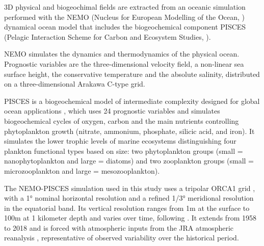 3D physical and biogeochimal fields are extracted from an oceanic simulation performed with the NEMO (Nucleus for European Modelling of the Ocean, \citealt{madecNEMOOceanEngine2019}) dynamical ocean model that includes the biogeochemical component PISCES (Pelagic Interaction Scheme for Carbon and Ecosystem Studies, \citealt{aumontPISCESv2OceanBiogeochemical2015}). 

NEMO simulates the dynamics and thermodynamics of the physical ocean. Prognostic variables are
the three-dimensional velocity field, a non-linear sea surface height, the
conservative temperature and the absolute salinity, distributed on a three-dimensional Arakawa C-type grid.

PISCES is a biogeochemical model of intermediate complexity designed for global ocean applications \citep{aumontPISCESv2OceanBiogeochemical2015}, which uses 24 prognostic variables and simulates biogeochemical cycles of oxygen, carbon and the main nutrients controlling phytoplankton growth (nitrate, ammonium, phosphate, silicic acid, and iron). It simulates the lower trophic levels of marine ecosystems distinguishing four plankton functional types based on size: two phytoplankton groups (small = nanophytoplankton and large = diatoms) and two zooplankton groups (small = microzooplankton and large = mesozooplankton). 

The NEMO-PISCES simulation used in this study uses a tripolar ORCA1 grid \citep{madecGlobalOceanMesh1996}, with a 1° nominal horizontal resolution and a refined 1/3° meridional resolution in the equatorial band. Its vertical resolution ranges from 1m at the surface to 100m at 1 kilometer depth and varies over time, following \cite{levierFreeSurfaceVariable2007}. It extends from 1958 to 2018 and is forced with atmospheric inputs from the JRA atmospheric reanalysis \citep{kobayashiJRA55ReanalysisGeneral2015}, representative of observed variability over the historical period. 

